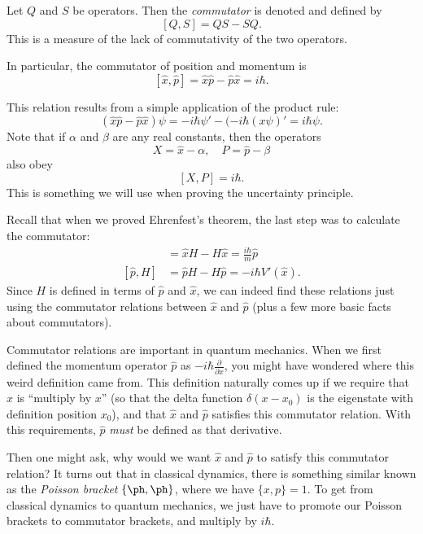 \documentclass[a4paper]{article}
\begin{document}
\begin{defi}[Commutator]
  Let $Q$ and $S$ be operators. Then the \emph{commutator} is denoted and defined by
  \[
    [Q, S] = QS - SQ.
  \]
  This is a measure of the lack of commutativity of the two operators.

  In particular, the commutator of position and momentum is
  \[
    [\hat{x}, \hat{p}] = \hat{x}\hat{p} - \hat{p}\hat{x} = i\hbar.
  \]
\end{defi}
This relation results from a simple application of the product rule:
\[
  (\hat{x}\hat{p} - \hat{p}\hat{x}) \psi = -i\hbar \psi' - (-i\hbar(x \psi)' = i\hbar \psi.
\]
Note that if $\alpha$ and $\beta$ are any real constants, then the operators
\[
  X = \hat{x} - \alpha,\quad P = \hat{p} - \beta
\]
also obey
\[
  [X, P] = i\hbar.
\]
This is something we will use when proving the uncertainty principle.

Recall that when we proved Ehrenfest's theorem, the last step was to calculate the commutator:
\begin{align*}
  [\hat{x}, H] &= \hat{x}H - H\hat{x} = \frac{i\hbar}{m}\hat{p}\\
  [\hat{p}, H] &= \hat{p}H - H\hat{p} = -i\hbar V'(\hat{x}).
\end{align*}
Since $H$ is defined in terms of $\hat{p}$ and $\hat{x}$, we can indeed find these relations just using the commutator relations between $\hat{x}$ and $\hat{p}$ (plus a few more basic facts about commutators).

Commutator relations are important in quantum mechanics. When we first defined the momentum operator $\hat{p}$ as $-i\hbar \frac{\partial}{\partial x}$, you might have wondered where this weird definition came from. This definition naturally comes up if we require that $\hat{x}$ is ``multiply by $x$'' (so that the delta function $\delta(x - x_0)$ is the eigenstate with definition position $x_0$), and that $\hat{x}$ and $\hat{p}$ satisfies this commutator relation. With this requirements, $\hat{p}$ \emph{must} be defined as that derivative.

Then one might ask, why would we want $\hat{x}$ and $\hat{p}$ to satisfy this commutator relation? It turns out that in classical dynamics, there is something similar known as the \emph{Poisson bracket} $\{\ph, \ph\}$, where we have $\{x, p\} = 1$. To get from classical dynamics to quantum mechanics, we just have to promote our Poisson brackets to commutator brackets, and multiply by $i\hbar$.
\end{document}
